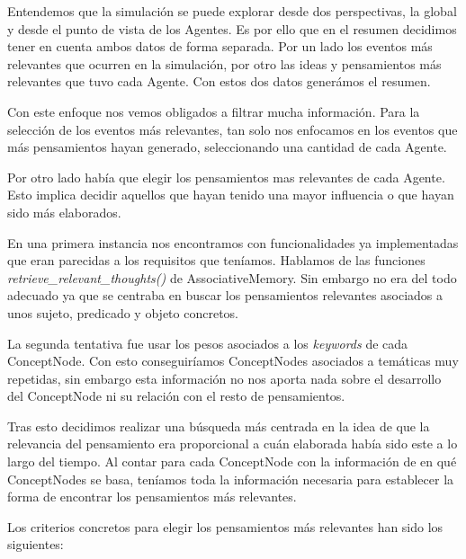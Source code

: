 Entendemos que la simulación se puede explorar desde dos perspectivas, la global y desde el punto de vista de los Agentes. Es por ello que en el resumen decidimos tener en cuenta ambos datos de forma separada. Por un lado los eventos más relevantes que ocurren en la simulación, por otro las ideas y pensamientos más relevantes que tuvo cada Agente. Con estos dos datos generámos el resumen.

Con este enfoque nos vemos obligados a filtrar mucha información. Para la selección de los eventos más relevantes, tan solo nos enfocamos en los eventos que más pensamientos hayan generado, seleccionando una cantidad de cada Agente.

Por otro lado había que elegir los pensamientos mas relevantes de cada Agente. Esto implica decidir aquellos que hayan tenido una mayor influencia o que hayan sido más elaborados.

En una primera instancia nos encontramos con funcionalidades ya implementadas que eran parecidas a los requisitos que teníamos. Hablamos de las funciones \textit{retrieve\_relevant\_thoughts()} de AssociativeMemory. Sin embargo no era del todo adecuado ya que se centraba en buscar los pensamientos relevantes asociados a unos sujeto, predicado y objeto concretos.

La segunda tentativa fue usar los pesos asociados a los \textit{keywords} de cada ConceptNode. Con esto conseguiríamos ConceptNodes asociados a temáticas muy repetidas, sin embargo esta información no nos aporta nada sobre el desarrollo del ConceptNode ni su relación con el resto de pensamientos.

Tras esto decidimos realizar una búsqueda más centrada en la idea de que la relevancia del pensamiento era proporcional a cuán elaborada había sido este a lo largo del tiempo. Al contar para cada ConceptNode con la información de en qué ConceptNodes se basa, teníamos toda la información necesaria para establecer la forma de encontrar los pensamientos más relevantes.

Los criterios concretos para elegir los pensamientos más relevantes han sido los siguientes:

